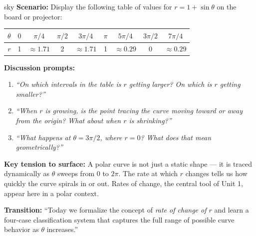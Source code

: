 \documentclass[10pt]{article}
\begin{document}
\begin{skillbox}{sky}
\textbf{Scenario:} Display the following table of values for $r = 1 + \sin\theta$
on the board or projector:

\vspace{6pt}
\renewcommand{\arraystretch}{1.4}
\begin{tabular}{|c|c|c|c|c|c|c|c|c|}
\hline
$\theta$ & $0$ & $\pi/4$ & $\pi/2$ & $3\pi/4$ & $\pi$ & $5\pi/4$ & $3\pi/2$ & $7\pi/4$ \\
\hline
$r$ & 1 & $\approx 1.71$ & 2 & $\approx 1.71$ & 1 & $\approx 0.29$ & 0 & $\approx 0.29$ \\
\hline
\end{tabular}

\vspace{8pt}
\textbf{Discussion prompts:}
\begin{enumerate}[leftmargin=1.4em, itemsep=3pt]
  \item \textit{``On which intervals in the table is $r$ getting larger? On which
    is $r$ getting smaller?''}
  \item \textit{``When $r$ is growing, is the point tracing the curve moving toward
    or away from the origin? What about when $r$ is shrinking?''}
  \item \textit{``What happens at $\theta = 3\pi/2$, where $r = 0$? What does that
    mean geometrically?''}
\end{enumerate}

\textbf{Key tension to surface:} A polar curve is not just a static shape --- it is
traced dynamically as $\theta$ sweeps from $0$ to $2\pi$. The rate at which $r$
changes tells us how quickly the curve spirals in or out. Rates of change, the central
tool of Unit 1, appear here in a polar context.

\textbf{Transition:} ``Today we formalize the concept of \emph{rate of change of $r$}
and learn a four-case classification system that captures the full range of possible
curve behavior as $\theta$ increases.''
\end{skillbox}

\vspace{0.08in}
\end{document}
